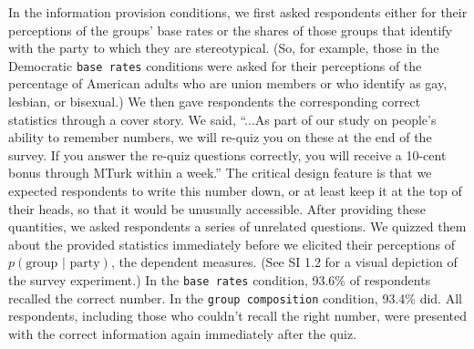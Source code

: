 \documentclass[12pt, letterpaper]{article}
\begin{document}
In the information provision conditions, we first asked respondents either for their perceptions of the groups' base rates or the shares of those groups that identify with the party to which they are stereotypical. (So, for example, those in the Democratic {\tt base rates} conditions were asked for their perceptions of the percentage of American adults who are union members or who identify as gay, lesbian, or bisexual.) We then gave respondents the corresponding correct statistics through a cover story. We said, ``...As part of our study on people's ability to remember numbers, we will re-quiz you on these at the end of the survey. If you answer the re-quiz questions correctly, you will receive a 10-cent bonus through MTurk within a week.'' The critical design feature is that we expected respondents to write this number down, or at least keep it at the top of their heads, so that it would be unusually accessible. After providing these quantities, we asked respondents a series of unrelated questions. We quizzed them about the provided statistics immediately before we elicited their perceptions of $p(\text{group | party})$, the dependent measures. (See SI 1.2 for a visual depiction of the survey experiment.) In the {\tt base rates} condition, 93.6\% of respondents recalled the correct number. In the {\tt group composition} condition, 93.4\% did. All respondents, including those who couldn't recall the right number, were presented with the correct information again immediately after the quiz.
\end{document}
